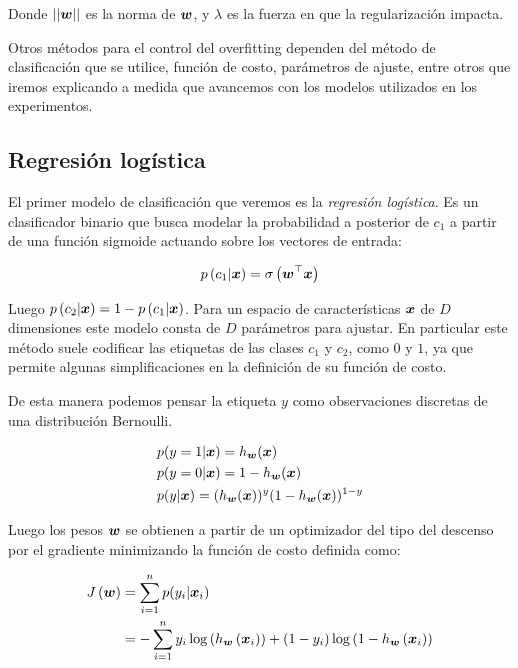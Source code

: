 Donde $||\boldsymbol{w}||$ es la norma de $\boldsymbol{w}$, y $\lambda$ es la fuerza en que
la regularización impacta.

Otros métodos para el control del overfitting dependen del método de
clasificación que se utilice, función de costo, parámetros de ajuste, entre
otros que iremos explicando a medida que avancemos con los modelos utilizados en
los experimentos.

\subsection{Regresión logística}

El primer modelo de clasificación que veremos es la \emph{regresión logística}.
Es un clasificador binario que busca modelar la probabilidad a posterior de
$c_1$ a partir de una función sigmoide actuando sobre los vectores de entrada:

\begin{align}
    p\left( c_1 | \boldsymbol{x} \right) = \sigma\left( \boldsymbol{w}^{\top} \boldsymbol{x} \right)
\end{align}

Luego $p\left( c_2 | \boldsymbol{x} \right) = 1 - p\left( c_1 | \boldsymbol{x} \right)$.
Para un espacio de características $\boldsymbol{x}$ de $D$ dimensiones este modelo
consta de $D$ parámetros para ajustar. En particular este método suele codificar
las etiquetas de las clases $c_1$ y $c_2$, como $0$ y $1$, ya que permite
algunas simplificaciones en la definición de su función de costo.

De esta manera podemos pensar la etiqueta $y$ como observaciones discretas de
una distribución Bernoulli.

\begin{align}
    & p(y = 1 | \boldsymbol{x}) = h_{\boldsymbol{w}}(\boldsymbol{x}) \\
    & p(y = 0 | \boldsymbol{x}) = 1 - h_{\boldsymbol{w}}(\boldsymbol{x}) \\
    & p(y | \boldsymbol{x}) = (h_{\boldsymbol{w}}(\boldsymbol{x}))^{y}(1 - h_{\boldsymbol{w}}(\boldsymbol{x}))^{1 - y}
\end{align}

Luego los pesos $\boldsymbol{w}$ se obtienen a partir de un optimizador del tipo del
descenso por el gradiente minimizando la función de costo definida como:

\begin{align}
    J\left( \boldsymbol{w} \right) &= \sum_{i=1}^{n} p(y_{i} | \boldsymbol{x}_{i}) \\
                             &= -\sum_{i=1}^{n}
                                    y_{i}\log\left( h_{\boldsymbol{w}}\left( \boldsymbol{x}_{i} \right) \right) +
                                    (1 - y_{i})\log\left(1 - h_{\boldsymbol{w}}\left( \boldsymbol{x}_{i} \right) \right)
\end{align}


